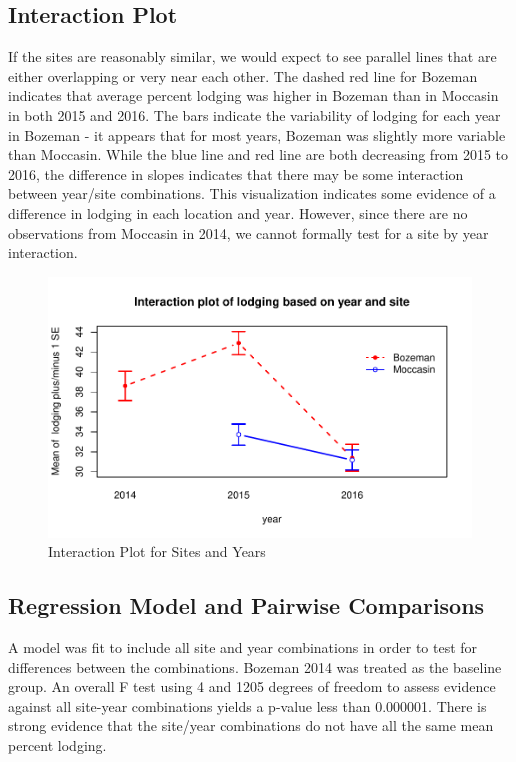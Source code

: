 \documentclass[11pt]{article}\usepackage[]{graphicx}\usepackage[]{color}
\makeatletter
\def\maxwidth{ %
  \ifdim\Gin@nat@width>\linewidth
    \linewidth
  \else
    \Gin@nat@width
  \fi
}
\newenvironment{knitrout}{}{} %
\makeatother
\begin{document}
\subsection{Interaction Plot}
If the sites are reasonably similar, we would expect to see parallel lines that are either overlapping or very near each other.  The dashed red line for Bozeman indicates that average percent lodging was higher in Bozeman than in Moccasin in both 2015 and 2016.  The bars indicate the variability of lodging for each year in Bozeman - it appears that for most years, Bozeman was slightly more variable than Moccasin. While the blue line and red line are both decreasing from 2015 to 2016, the difference in slopes indicates that there may be some interaction between year/site combinations.  This visualization indicates some evidence of a difference in lodging in each location and year. However, since there are no observations from Moccasin in 2014, we cannot formally test for a site by year interaction. 

\begin{knitrout}\footnotesize
{}\color{fgcolor}\begin{figure}[H]

{\centering \includegraphics[width=\maxwidth]{figure/tables-1} 

}

\caption[Interaction Plot for Sites and Years]{Interaction Plot for Sites and Years}\label{fig:tables}
\end{figure}


\end{knitrout}

\pagebreak
\subsection{Regression Model and Pairwise Comparisons}
A model was fit to include all site and year combinations in order to test for differences between the combinations. Bozeman 2014 was treated as the baseline group. An overall F test using 4 and 1205 degrees of freedom to assess evidence against all site-year combinations yields a p-value less than 0.000001. There is strong evidence that the site/year combinations do not have all the same mean percent lodging. 
  
\end{document}
